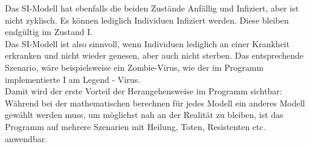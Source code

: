 Das SI-Modell hat ebenfalls die beiden Zustände Anfällig und Infiziert, aber ist nicht zyklisch. Es können lediglich Individuen Infiziert werden. Diese bleiben endgültig im Zustand I.\\
Das SI-Modell ist also sinnvoll, wenn Individuen lediglich an einer Krankheit erkranken und nicht wieder genesen, aber auch nicht sterben. Das entsprechende Szenario, wäre beispielsweise ein Zombie-Virus, wie der im Programm implementierte \glqq I am Legend - Virus\grqq.\\
Damit wird der erste Vorteil der Herangehensweise im Programm sichtbar: Während bei der mathematischen berechnen für jedes Modell ein anderes Modell gewählt werden muss, um möglichst nah an der Realität zu bleiben, ist das Programm auf mehrere Szenarien mit Heilung, Toten, Resistenten etc. anwendbar.